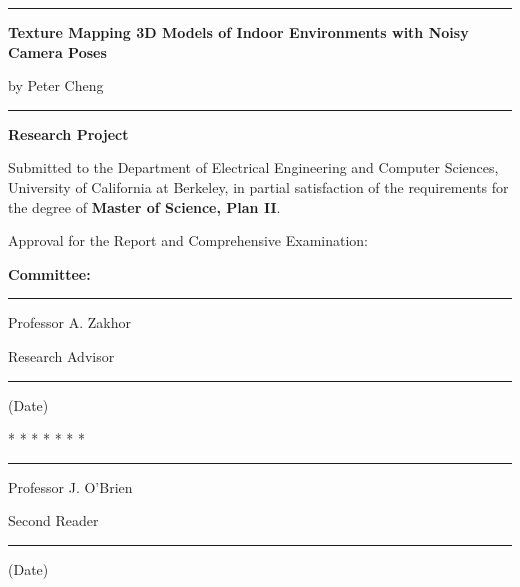 \documentclass[12pt]{article}
\def\title{Texture Mapping 3D Models of Indoor Environments with Noisy Camera Poses}
\def\author{Peter Cheng}
\def\signatureA{Professor A. Zakhor}
\def\signatureB{Professor J. O'Brien}
\begin{document}
\thispagestyle{empty}

\begin{center}
\rule{5.5in}{0.40mm}

\vspace{0.35in}
\large{\bf\title{}}

\vspace{0.25in}
{\large by \author{}}

\vspace{0.35in}
\rule{5.5in}{0.40mm}

\vspace{0.5in}
{\large {\bf Research Project}}
\end{center}

Submitted to the Department of Electrical Engineering and
Computer Sciences, University of California at Berkeley,
in partial satisfaction of the requirements for the degree
of {\bf Master of Science, Plan II}.

\vspace{0.25in}
Approval for the Report and Comprehensive Examination:

\begin{center}
{\bf Committee:}

\vspace{0.25in}
\rule{3.5in}{0.25mm}

\signatureA

Research Advisor

\vspace{0.25in}
\rule{3.5in}{0.25mm}

(Date)

\vspace{0.25in}
* * * * * * *

\vspace{0.25in}
\rule{3.5in}{0.25mm}

\signatureB

Second Reader

\vspace{0.25in}
\rule{3.5in}{0.25mm}

(Date)
\end{center}
\end{document}
